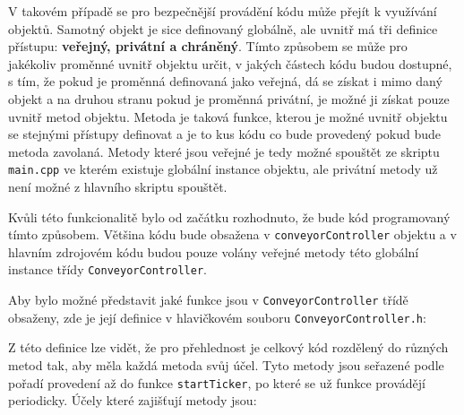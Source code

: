 V takovém případě se pro bezpečnější provádění kódu může přejít k využívání objektů. Samotný objekt je sice definovaný globálně, ale uvnitř má tři definice přístupu: \textbf{veřejný, privátní a chráněný}. Tímto způsobem se může pro jakékoliv proměnné uvnitř objektu určit, v jakých částech kódu budou dostupné, s tím, že pokud je proměnná definovaná jako veřejná, dá se získat i mimo daný objekt a na druhou stranu pokud je proměnná privátní, je možné ji získat pouze uvnitř metod objektu. Metoda je taková funkce, kterou je možné uvnitř objektu se stejnými přístupy definovat a je to kus kódu co bude provedený pokud bude metoda zavolaná. Metody které jsou veřejné je tedy možné spouštět ze skriptu \texttt{main.cpp} ve kterém existuje globální instance objektu, ale privátní metody už není možné z hlavního skriptu spouštět.

Kvůli této funkcionalitě bylo od začátku rozhodnuto, že bude kód programovaný tímto způsobem. Většina kódu bude obsažena v \texttt{conveyorController} objektu a v hlavním zdrojovém kódu budou pouze volány veřejné metody této globální instance třídy \texttt{Con\-ve\-yor\-Con\-tro\-ller}.

Aby bylo možné představit jaké funkce jsou v \texttt{ConveyorController} třídě obsaženy, zde je její definice v hlavičkovém souboru \texttt{ConveyorController.h}:



Z této definice lze vidět, že pro přehlednost je celkový kód rozdělený do různých metod tak, aby měla každá metoda svůj účel. Tyto metody jsou seřazené podle pořadí provedení až do funkce \texttt{startTicker}, po které se už funkce provádějí periodicky. Účely které zajišťují metody jsou:

